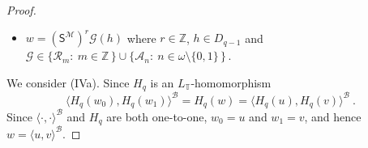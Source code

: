 \documentclass[10pt,a4paper, openany,  oldfontcommands]{memoir}
\newtheorem{open problem} [theorem] {Open Problem}
\newtheorem{open question} [theorem] {Open Question}
\renewcommand{\mathrm}{\mathsf}
\begin{document}
\begin{proof}
\begin{itemize}
\item[(IVb)]  $    w  =  \left(  \mathrm{S}^{  \mathcal{M}  }  \right)^r    \mathcal{G}  \left(   h   \right)   $  where  
$  r  \in  \mathbb{Z} $, 
$   h  \in  D_{q-1}      $
and     $  \mathcal{G}  \in    \lbrace  \mathcal{R}_m   :  \   m  \in  \mathbb{Z} \,   \rbrace   \cup 
 \lbrace  \mathcal{A}_n :  \   n  \in    \omega  \setminus \lbrace 0, 1   \rbrace  \,   \rbrace       \,   $.
\end{itemize}
We consider (IVa). 
Since  $ H_q  $  is an $  L_{  \mathbb{T} }  $-homomorphism 
\[
\langle H_q (w_0)  ,   H_q  (w_1)    \rangle^{  \mathcal{B}  }   =  H_q (w)  = 
 \langle  H_q(u) , H_q (v)  \rangle^{  \mathcal{B}  }       
 \    .  
\]
Since    $  \langle  \cdot  ,  \cdot   \rangle^{  \mathcal{B}  }  $  and  $  H_q  $  are both one-to-one, 
$  w_0  =  u $  and  $  w_ 1 = v  $, 
and hence     $  w  =   \langle u, v  \rangle^{  \mathcal{B}  }  $.








\end{proof}
\end{document}
